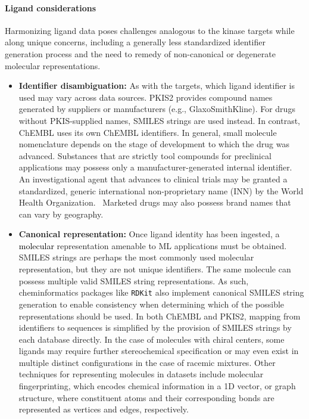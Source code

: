 \documentclass[9pt,lessons]{livecoms}
\newcommand{\revision}[1]{\textcolor{black}{#1}}
\begin{document}
\paragraph{Ligand considerations}
Harmonizing ligand data poses challenges analogous to the kinase targets while along unique concerns, including a generally less standardized identifier generation process and the need to remedy of non-canonical or degenerate molecular representations. %
\begin{itemize}
\item {\bf Identifier disambiguation:} As with the targets, which ligand identifier is used may vary across data sources. PKIS2 provides compound names generated by suppliers or manufacturers (e.g., GlaxoSmithKline). For drugs without PKIS-supplied names, SMILES strings are used instead. In contrast, ChEMBL uses its own ChEMBL identifiers. In general, small molecule nomenclature depends on the stage of development to which the drug was advanced. Substances that are strictly tool compounds for preclinical applications may possess only a manufacturer-generated internal identifier. An investigational agent that advances to clinical trials may be granted a standardized, generic international non-proprietary name (INN) by the World Health Organization.~\cite{debruyne2018inn} Marketed drugs may also possess brand names that can vary by geography.
\item {\bf Canonical representation:} Once ligand identity has been ingested, a \revision{molecular} representation amenable to ML applications must be obtained. SMILES strings are perhaps the most commonly used molecular representation, but they are not unique identifiers. The same molecule can possess multiple valid SMILES string representations. As such, cheminformatics packages like \texttt{RDKit} also implement canonical SMILES string generation to enable consistency when determining which of the possible representations should be used. In both ChEMBL and PKIS2, mapping from identifiers to sequences is simplified by the provision of SMILES strings by each database directly. In the case of molecules with chiral centers, some ligands may require further stereochemical specification or may even exist in multiple distinct configurations in the case of racemic mixtures. Other techniques for representing molecules in datasets include molecular fingerprinting, which encodes chemical information in a 1D vector, or graph structure, where constituent atoms and their corresponding bonds are represented as vertices and edges, respectively.~\cite{david2020cheminform}

\end{itemize}
\end{document}
